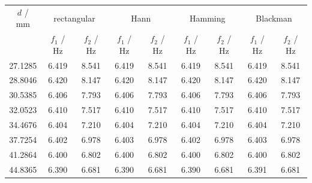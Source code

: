 \begin{tabular}{@{}ccccccccc@{}}
\toprule
$d$ / mm & \multicolumn{2}{c}{rectangular} & \multicolumn{2}{c}{Hann} & \multicolumn{2}{c}{Hamming} & \multicolumn{2}{c}{Blackman} \\
 & $f_1$ / Hz & $f_2$ / Hz & $f_1$ / Hz & $f_2$ / Hz & $f_1$ / Hz & $f_2$ / Hz & $f_1$ / Hz & $f_2$ / Hz \\
\midrule
27.1285 & 6.419 & 8.541 & 6.419 & 8.541 & 6.419 & 8.541 & 6.419 & 8.541 \\
28.8046 & 6.420 & 8.147 & 6.420 & 8.147 & 6.420 & 8.147 & 6.420 & 8.147 \\
30.5385 & 6.406 & 7.793 & 6.406 & 7.793 & 6.406 & 7.793 & 6.406 & 7.793 \\
32.0523 & 6.410 & 7.517 & 6.410 & 7.517 & 6.410 & 7.517 & 6.410 & 7.517 \\
34.4676 & 6.404 & 7.210 & 6.404 & 7.210 & 6.404 & 7.210 & 6.404 & 7.210 \\
37.7254 & 6.402 & 6.978 & 6.403 & 6.978 & 6.402 & 6.978 & 6.403 & 6.978 \\
41.2864 & 6.400 & 6.802 & 6.400 & 6.802 & 6.400 & 6.802 & 6.400 & 6.802 \\
44.8365 & 6.390 & 6.681 & 6.390 & 6.681 & 6.390 & 6.681 & 6.391 & 6.681 \\
\bottomrule
\end{tabular}